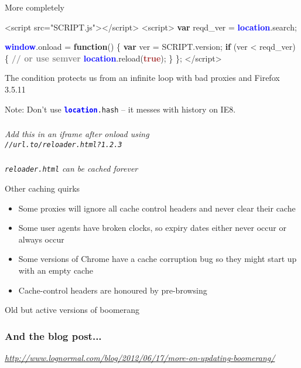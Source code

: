 \documentclass{beamer}
\newcommand{\innersplash}[1]{
  \begin{center}
    \Large \textrm{\textit{ #1 } }
  \end{center}
}
\newcommand{\splashslide}[2][{}]{
  \begin{frame}
  \frametitle{#1}
  \innersplash{#2}
  \end{frame}
}
\def\gray<#1>#2{\textcolor<#1>{gray}{\textbf<#1>{#2}}}
\def\brown<#1>#2{\textcolor<#1>{brown}{\textbf<#1>{#2}}}
\def\green<#1>#2{\textcolor<#1>{dark-green}{\textbf<#1>{#2}}}
\def\blue<#1>#2{\textcolor<#1>{blue}{\textbf<#1>{#2}}}
\begin{document}
\begin{frame}[fragile]{More completely}
\begin{semiverbatim}
<script src="SCRIPT.js"></script>
<script>
\green<1>{var} reqd\_ver = \blue<1>{location}.search;

\blue<1>{window}.onload = \green<1>{function}() \{
    \green<1>{var} ver = SCRIPT.version;
    \green<1>{if} (ver < reqd\_ver) \{ \gray<1>{// or use semver}
        \blue<1>{location}.reload(\brown<1>{true});
    \}
\};
</script>
\end{semiverbatim}

The condition protects us from an infinite loop with bad proxies and Firefox 3.5.11

\small Note: Don't use \texttt{\blue<1>{location}.hash} -- it messes with history on IE8.
\end{frame}

\splashslide{Add this in an iframe after onload using \\ \small \texttt{//url.to/reloader.html?1.2.3}}

\splashslide{\texttt{reloader.html} can be cached forever}

\begin{frame}{Other caching quirks}
  \begin{itemize}
  \item Some proxies will ignore all cache control headers and never clear their cache
  \item Some user agents have broken clocks, so expiry dates either never occur or always occur
  \item Some versions of Chrome have a cache corruption bug so they might start up with an empty cache
  \item Cache-control headers are honoured by pre-browsing
  \end{itemize}
\end{frame}

\begin{frame}{Old but active versions of boomerang}
\end{frame}



\splashslide[And the blog post...]{\href{http://www.lognormal.com/blog/2012/06/17/more-on-updating-boomerang/}{http://www.lognormal.com/blog/2012/06/17/more-on-updating-boomerang/}}
\end{document}

